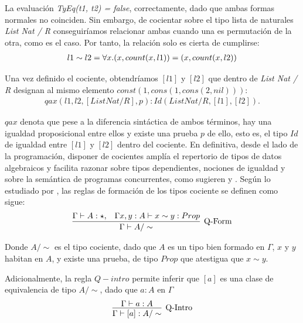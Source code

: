 La evaluación \textit{TyEq(t1, t2) = false}, correctamente, dado que ambas formas normales no coinciden. Sin embargo, de cocientar sobre el tipo lista de naturales \textit{List Nat / R} conseguiríamos relacionar ambas cuando una es permutación de la otra, como es el caso. Por tanto, la relación solo es cierta de cumplirse:
\begin{align}
& l1 \sim l2 = \forall x . (x, count(x, l1)) = (x, count(x, l2)) \notag \\
\end{align}

Una vez definido el cociente, obtendríamos $[l1]$ y $[l2]$ que dentro de \textit{List Nat / R} designan al mismo elemento $const(1, cons(1, cons(2, nil)))$:
\begin{align}
  qax(l1, l2, [List Nat / R], p) : Id(List Nat / R, [l1], [l2]) .
\end{align}

$qax$ denota que pese a la diferencia sintáctica de ambos términos, hay una igualdad proposicional entre ellos y existe una prueba $p$ de ello, esto es, el tipo $Id$ de igualdad entre $[l1]$ y $[l2]$ dentro del cociente.
\newline 
\newline 
\indent En definitiva, desde el lado de la programación, disponer de cocientes amplía el repertorio de tipos de datos algebraicos y facilita razonar sobre tipos dependientes, nociones de igualdad y sobre la semántica de programas concurrentes, como sugieren \cite{nuoli} y \cite{hofmann1995}.
\newline
\newline
Según lo estudiado por \cite{nuoli}, las reglas de formación de los tipos cociente se definen como sigue:
\begin{gather}
  \infer[\text{Q-Form}]
  {\Gamma \vdash A/\sim}
  {\Gamma \vdash A : \star, & \Gamma x, y : A \vdash x \sim y : Prop}
\end{gather}

Donde $A/\sim$ es el tipo cociente, dado que $A$ es un tipo bien formado en $\Gamma$, $x$ y $y$ habitan en $A$, y existe una prueba, de tipo $Prop$ que atestigua que $x \sim y$.

Adicionalmente, la regla $Q-intro$ permite inferir que $[a]$ es una clase de equivalencia de tipo $A/\sim$, dado que $a : A$ en $\Gamma$
\begin{gather}
  \infer[\text{Q-Intro}]
  {\Gamma \vdash [a] : A/\sim}
  {\Gamma \vdash a : A}
\end{gather}

